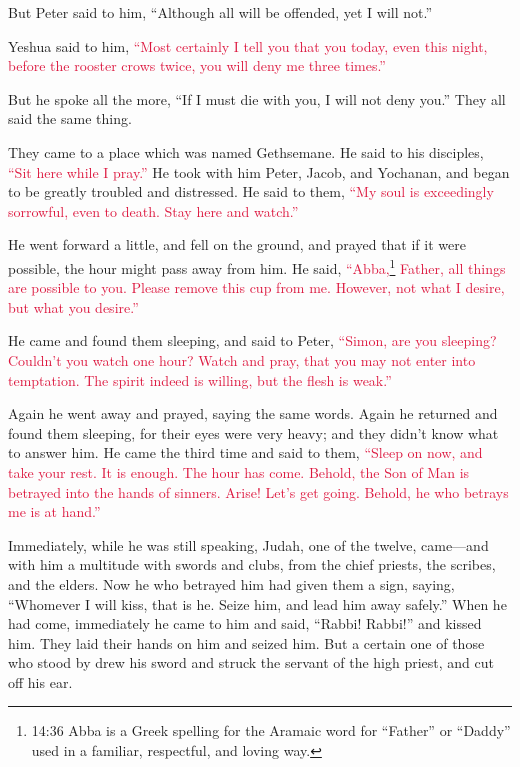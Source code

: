 \myverse{}But Peter said to him, “Although all will be offended, yet I
will not.”

\myverse{}Yeshua said to him,
\textcolor{crimson}{“Most certainly I tell you that you today, even this night, before the rooster crows twice, you will
	deny me three times.”
}

\myverse{}But he spoke all the more, “If I must die with you, I will not
deny you.” They all said the same thing.

\myverse{}They came to a place which was named Gethsemane. He said to
his disciples,
\textcolor{crimson}{“Sit here while I pray.”}
\myverse{}He took with him Peter, Jacob, and Yochanan, and began to be greatly troubled
and distressed.
\myverse{}He said to them,
\textcolor{crimson}{“My soul is exceedingly sorrowful, even to death. Stay here and watch.”}

\myverse{}He went forward a little, and fell on the ground, and prayed
that if it were possible, the hour might pass away from him.
\myverse{}He said,
\textcolor{crimson}{“Abba,}\footnote{14:36 Abba is a Greek spelling for the Aramaic word for “Father” or “Daddy” used in a familiar, respectful,
	and loving way.
}
\textcolor{crimson}{Father, all things are possible to you. Please remove this cup from me. However, not what I desire,
	but what you desire.”
}

\myverse{}He came and found them sleeping, and said to Peter,
\textcolor{crimson}{“Simon, are you sleeping? Couldn’t you watch one hour?
}
\myverse{}\textcolor{crimson}{Watch and pray, that you may not enter into temptation. The spirit indeed
	is willing, but the flesh is weak.”}

\myverse{}Again he went away and prayed, saying the same words.
\myverse{}Again he returned and found them sleeping, for their eyes were very heavy;
and they didn’t know what to answer him.
\myverse{}He came the third time and said to them,
\textcolor{crimson}{“Sleep on now, and take your rest. It is enough. The hour has come. Behold, the Son of Man is betrayed
	into the hands of sinners.
}
\myverse{}\textcolor{crimson}{Arise! Let’s get going. Behold, he who betrays me is at hand.”
}

\myverse{}Immediately, while he was still speaking, Judah, one of the
twelve, came—and with him a multitude with swords and clubs, from the chief priests, the scribes, and
the elders.
\myverse{}Now he who betrayed him had given them a sign, saying, “Whomever I will kiss,
that is he. Seize him, and lead him away safely.”
\myverse{}When he had come, immediately he came to him and said, “Rabbi! Rabbi!” and
kissed him.
\myverse{}They laid their hands on him and seized him.
\myverse{}But a certain one of those who stood by drew his sword and struck the servant
of the high priest, and cut off his ear.

